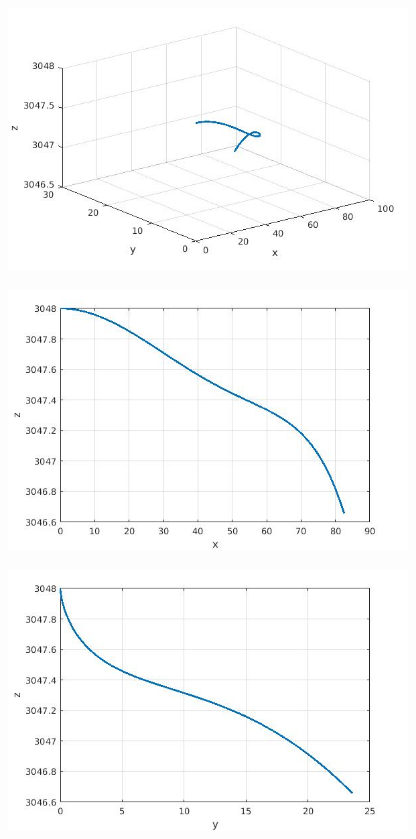 \documentclass[a4paper,12pt]{scrartcl}
\begin{document}
\begin{figure}[htp]
	\centering
	\includegraphics[width=300pt]{kurve1.jpg}
	\label{fig:k1}
\end{figure}
\begin{figure}[htp]
	\centering
	\includegraphics[width=300pt]{Kurve2.jpg}
	\label{fig:k2}
\end{figure}
\begin{figure}[htp]
	\centering
	\includegraphics[width=300pt]{Kurve3.jpg}
	\label{fig:k3}
\end{figure}
\end{document}
